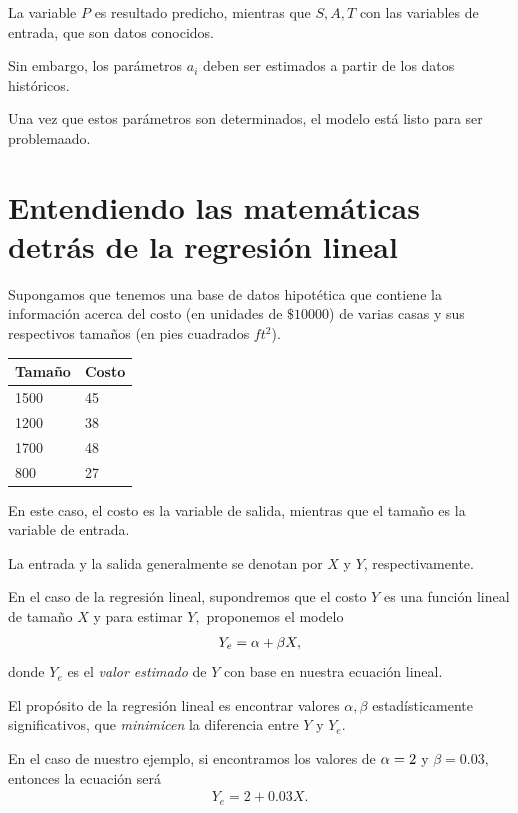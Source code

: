 La variable $P$ es resultado predicho, mientras que $S,A,T$ con las variables de entrada, que son datos conocidos.


Sin embargo, los parámetros $a_{i}$ deben ser estimados a partir de los datos históricos.


Una vez que estos parámetros son determinados, el modelo está listo para ser problemaado.


\section{Entendiendo las matemáticas detrás de la regresión lineal}

Supongamos que tenemos una base de datos hipotética que contiene la información acerca del costo (en unidades de $\$10000$) de varias casas y sus respectivos tamaños (en pies cuadrados $ft^{2}$).


\begin{center}
\begin{tabular}{|l|l|}\hline
Tamaño & Costo\\\hline
1500 & 45\\\hline
1200 & 38\\\hline
1700 & 48\\\hline
800 & 27\\\hline
\end{tabular}
\end{center}



En este caso, el costo es la variable de salida, mientras que el tamaño es la variable de entrada. 

La entrada y la salida generalmente se denotan por $X$ y $Y$, respectivamente.


En el caso de la regresión lineal, supondremos que el costo $Y$ es una función lineal de tamaño $X$ y para estimar $Y,$ proponemos el modelo \begin{align}
 Y_{e} = \alpha + \beta X ,
\end{align}
donde $Y_{e}$ es el \emph{valor estimado} de $Y$ con base en nuestra ecuación lineal.


 \begin{rem}
  El propósito de la regresión lineal es encontrar valores $\alpha, \beta$ estadísticamente significativos, que \emph{minimicen} la diferencia entre $Y$ y $Y_{e}.$
 \end{rem}



En el caso de nuestro ejemplo, si encontramos los valores de $\alpha=2$ y $\beta=0.03,$ entonces la ecuación será
\begin{align}
 Y_{e}= 2 + 0.03 X.
\end{align}


